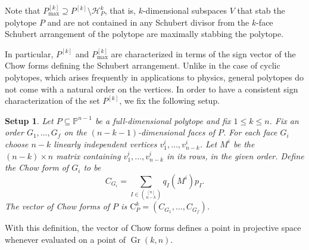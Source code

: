 \documentclass[english]{ourlematema}
\newtheorem{setup}[thm]{Setup}
\DeclareMathOperator{\Gr}{Gr}
\newcommand{\PP}{\mathbb{P}}
\newcommand{\Pk}{P^{[k]}}
\newcommand{\Pkmax}{P^{[k]}_{\max}}
\newcommand{\HPk}{\mathcal{H}_P^k}
\newcommand{\CPk}{\mathrm{C}_P^k}
\begin{document}
Note that $\Pkmax \supseteq \Pk \setminus \HPk$, that is, $k$-dimensional subspaces $V$ that stab the polytope $P$ and are not contained in any Schubert divisor from the $k$-face Schubert arrangement of the polytope are maximally stabbing the polytope.

In particular, $\Pk$ and $\Pkmax$ are characterized in terms of the sign vector of the Chow forms defining the Schubert arrangement. 
Unlike in the case of cyclic polytopes, which arises frequently in applications to physics, general polytopes do not come with a natural order on the vertices. In order to have a consistent sign characterization of the set $\Pk$, we fix the following setup.

\begin{setup}\label{setup : Chow forms}
    Let $P\subseteq \PP^{n-1}$ be a full-dimensional polytope and fix $1\leq k \leq n$. Fix an order $G_1, \ldots, G_f$ on the $(n-k-1)$-dimensional faces of $P$. For each face $G_i$ choose $n-k$ linearly independent vertices $v^{i}_1,\ldots, v^{i}_{n-k}$. Let $M^i$ be the $(n-k)\times n$ matrix containing $v^{i}_1,\ldots, v^{i}_{n-k}$ in its rows, in the given order. Define the Chow form of $G_i$ to be 
    \[ C_{G_i} = \sum_{I \in \binom{[n]}{n-k}} q_I(M^i)p_I. \]
    The \emph{vector of Chow forms} of $P$ is $\CPk = (C_{G_1},
    \ldots, C_{G_f})$.
\end{setup}

With this definition, the vector of Chow forms defines a point in projective space whenever evaluated on a point of $\Gr(k,n)$.
\end{document}
